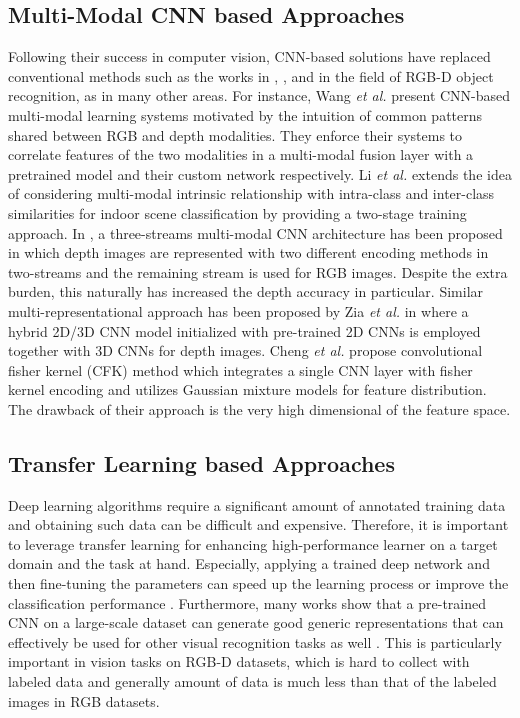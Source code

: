 \documentclass[10pt,journal,compsoc]{IEEEtran}
\begin{document}
\subsection{Multi-Modal CNN based Approaches}
Following their success in computer vision, CNN-based solutions have replaced conventional methods such as the works in \cite{DepthKernel2011}, \cite{HKD2011}, and \cite{HONV2012} in the field of RGB-D object recognition, as in many other areas. For instance, Wang \textit{et al.} \cite{Wang_2015_ICCV, Wang_2015_IEEE_ToM} present CNN-based multi-modal learning systems motivated by the intuition of common patterns shared between RGB and depth modalities. They enforce their systems to correlate features of the two modalities in a multi-modal fusion layer with a pretrained model \cite{Wang_2015_ICCV} and their custom network \cite{Wang_2015_IEEE_ToM} respectively. Li \textit{et al.} \cite{Li_AAAI_2018df} extends the idea of considering multi-modal intrinsic relationship with intra-class and inter-class similarities for indoor scene classification by providing a two-stage training approach. In \cite{Rahman_ICME_2017}, a three-streams multi-modal CNN architecture has been proposed in which depth images are represented with two different encoding methods in two-streams and the remaining stream is used for RGB images. Despite the extra burden, this naturally has increased the depth accuracy in particular. Similar multi-representational approach has been proposed by Zia \textit{et al.} in \cite{Zia_ICCVW_2017} where a hybrid 2D/3D CNN model initialized with pre-trained 2D CNNs is employed together with 3D CNNs for depth images. Cheng \textit{et al.} \cite{Cheng_3DV_2015} propose convolutional fisher kernel (CFK) method which integrates a single CNN layer with fisher kernel encoding and utilizes Gaussian mixture models for feature distribution. The drawback of their approach is the very high dimensional of the feature space.

\subsection{Transfer Learning based Approaches}
Deep learning algorithms require a significant amount of annotated training data and obtaining such data can be difficult and expensive. Therefore, it is important to leverage transfer learning for enhancing high-performance learner on a target domain and the task at hand. Especially, applying a trained deep network and then fine-tuning the parameters can speed up the learning process or improve the classification performance \cite{Wang_TIP_2017}. Furthermore, many works show that a pre-trained CNN on a large-scale dataset can generate good generic representations that can effectively be used for other visual recognition tasks as well \cite{Razavian_CVPRW_2014, Yosinski_NIPS_2014, Oquab_CVPR_2014, Azizpour_CVPRW_2015, Azizpour_TPAMI_2015}. This is particularly important in vision tasks on RGB-D datasets, which is hard to collect with labeled data and generally amount of data is much less than that of the labeled images in RGB datasets.
\end{document}
